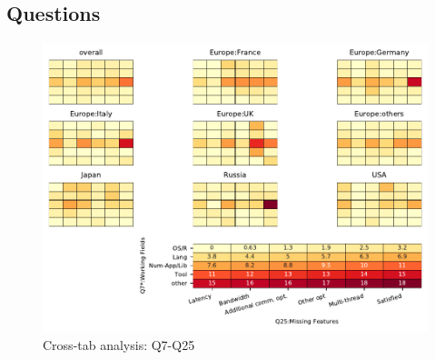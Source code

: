 
\subsection{Questions}


\begin{figure}
\begin{center}
\includegraphics[width=12cm]{../pdfs/Q7-Q25.pdf}
\caption{Cross-tab analysis: Q7-Q25}
\label{fig:Q7-Q25}
\end{center}
\end{figure}
